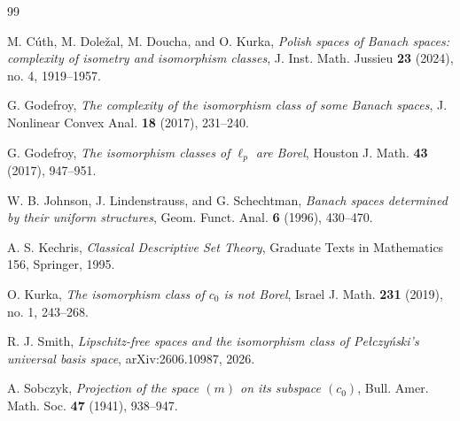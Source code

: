 \documentclass[11pt]{article}
\theoremstyle{definition}
\begin{document}
\begin{thebibliography}{99}

M. Cúth, M. Doležal, M. Doucha, and O. Kurka,
\emph{Polish spaces of Banach spaces: complexity of isometry and isomorphism
classes},
J. Inst. Math. Jussieu \textbf{23} (2024), no. 4, 1919--1957.

G. Godefroy,
\emph{The complexity of the isomorphism class of some Banach spaces},
J. Nonlinear Convex Anal. \textbf{18} (2017), 231--240.

G. Godefroy,
\emph{The isomorphism classes of \(\ell_p\) are Borel},
Houston J. Math. \textbf{43} (2017), 947--951.

W. B. Johnson, J. Lindenstrauss, and G. Schechtman,
\emph{Banach spaces determined by their uniform structures},
Geom. Funct. Anal. \textbf{6} (1996), 430--470.

A. S. Kechris,
\emph{Classical Descriptive Set Theory},
Graduate Texts in Mathematics 156, Springer, 1995.

O. Kurka,
\emph{The isomorphism class of \(c_0\) is not Borel},
Israel J. Math. \textbf{231} (2019), no. 1, 243--268.

R. J. Smith,
\emph{Lipschitz-free spaces and the isomorphism class of
Pełczyński's universal basis space},
arXiv:2606.10987, 2026.

A. Sobczyk,
\emph{Projection of the space \((m)\) on its subspace \((c_0)\)},
Bull. Amer. Math. Soc. \textbf{47} (1941), 938--947.

\end{thebibliography}
\end{document}
